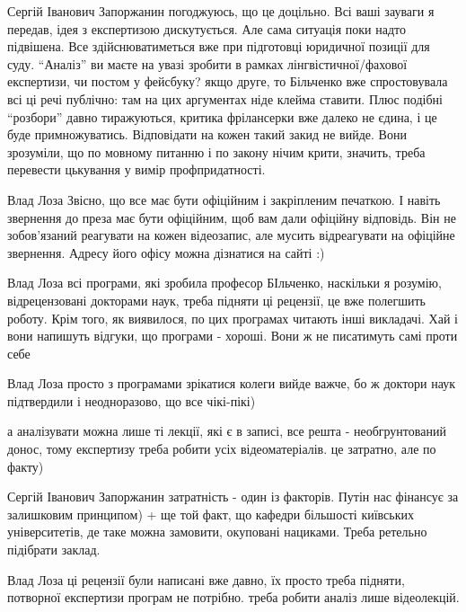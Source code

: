 \begin{itemize}
\begin{itemize}

Сергій Іванович Запоржанин погоджуюсь, що це доцільно. Всі ваші зауваги я
передав, ідея з експертизою дискутується. Але сама ситуація поки надто
підвішена. Все здійснюватиметься вже при підготовці юридичної позиції для суду.
\enquote{Аналіз} ви маєте на увазі зробити в рамках лінгвістичної/фахової експертизи,
чи постом у фейсбуку? якщо друге, то Більченко вже спростовувала всі ці речі
публічно: там на цих аргументах ніде клейма ставити. Плюс подібні \enquote{розбори}
давно тиражуються, критика фрілансерки вже далеко не єдина, і це буде
примножуватись. Відповідати на кожен такий закид не вийде. Вони зрозуміли, що
по мовному питанню і по закону нічим крити, значить, треба перевести цькування
у вимір профпридатності.


Влад Лоза Звісно, що все має бути офіційним і закріпленим печаткою. І навіть
звернення до преза має бути офіційним, щоб вам дали офіційну відповідь. Він не
зобов'язаний реагувати на кожен відеозапис, але мусить відреагувати на офіційне
звернення. Адресу його офісу можна дізнатися на сайті :)


Влад Лоза всі програми, які зробила професор БІльченко, наскільки я розумію,
відрецензовані докторами наук, треба підняти ці рецензії, це вже полегшить
роботу. Крім того, як виявилося, по цих програмах читають інші викладачі. Хай і
вони напишуть відгуки, що програми - хороші. Вони ж не писатимуть самі проти
себе


Влад Лоза просто з програмами зрікатися колеги вийде важче, бо ж доктори наук
підтвердили і неодноразово, що все чікі-пікі)


а аналізувати можна лише ті лекції, які є в записі, все решта - необгрунтований
донос, тому експертизу треба робити усіх відеоматеріалів. це затратно, але по
факту)


Сергій Іванович Запоржанин затратність - один із факторів. Путін нас фінансує
за залишковим принципом) + ще той факт, що кафедри більшості київських
університетів, де таке можна замовити, окуповані нациками. Треба ретельно
підібрати заклад.


Влад Лоза ці рецензії були написані вже давно, їх просто треба підняти,
потворної експертизи програм не потрібно. треба робити аналіз лише відеолекцій.


\end{itemize}
\end{itemize}
